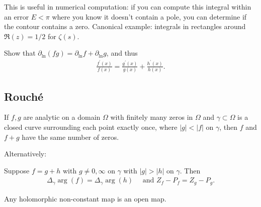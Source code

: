 \begin{remark}

This is useful in numerical computation: if you can compute this
integral within an error \(E < \pi\) where you know it doesn't contain a
pole, you can determine if the contour contains a zero. Canonical
example: integrals in rectangles around \(\Re(z) = 1/2\) for
\(\zeta(s)\).

\end{remark}

\begin{exercise}[?]

Show that
\({\partial}_{\ln}(fg) = {\partial}_{\ln} f + {\partial}_{\ln} g\), and
thus
\begin{align*}
\frac{f^{\prime}(x)}{f(x)}=\frac{g^{\prime}(x)}{g(x)}+\frac{h^{\prime}(x)}{h(x)}
.\end{align*}

\end{exercise}

\hypertarget{rouchuxe9}{%
\subsection{Rouché}\label{rouchuxe9}}

\begin{corollary}\label{Rouche}

If \(f, g\) are analytic on a domain \(\Omega\) with finitely many zeros
in \(\Omega\) and \(\gamma \subset \Omega\) is a closed curve
surrounding each point exactly once, where
\({\left\lvert {g} \right\rvert} < {\left\lvert {f} \right\rvert}\) on
\(\gamma\), then \(f\) and \(f+g\) have the same number of zeros.

Alternatively:

Suppose \(f = g + h\) with \(g \neq 0, \infty\) on \(\gamma\) with
\({\left\lvert {g} \right\rvert} > {\left\lvert {h} \right\rvert}\) on
\(\gamma\). Then
\begin{align*}\Delta_\gamma \arg(f) = \Delta_\gamma \arg(h)\quad\text{ and } Z_f - P_f = Z_g - P_g.\end{align*}

\end{corollary}


\begin{corollary}

Any holomorphic non-constant map is an open map.

\end{corollary}

